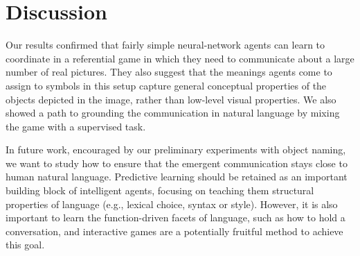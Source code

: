 \section{Discussion}

Our results confirmed that fairly simple neural-network agents can
learn to coordinate in a referential game in which they need to
communicate about a large number of real pictures. 
They also
suggest that the meanings agents come to assign to symbols in this setup
 capture general conceptual properties of the objects depicted in the
image, rather than low-level visual properties. We also showed a path to grounding the communication in natural language by mixing the game with a supervised task.

In future work, encouraged by our preliminary experiments
with object naming, we want to study how to ensure that the emergent
communication stays close to human natural language. %
Predictive learning should be retained as an
important building block of intelligent agents, focusing on teaching
them structural properties of language (e.g., lexical choice, syntax
 or style).  However, it is also important to learn the function-driven facets of language, 
such
as how to hold a conversation, and interactive games are a potentially fruitful method to achieve this goal. %




